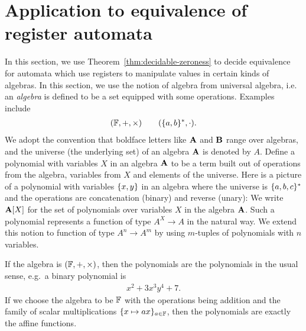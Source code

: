 \section{Application to equivalence of register automata}
\label{sec:applications-of-zeroness}
In this section, we  use Theorem~\ref{thm:decidable-zeroness} to decide equivalence for automata which use registers to manipulate values in certain kinds of algebras. In this section, we use the notion of algebra from universal algebra, 
i.e.~ an \emph{algebra} is defined to  be a set equipped with some operations. Examples include
\begin{align*}
  (\mathbb F, + , \times) \qquad (\{a,b\}^*, \cdot).
\end{align*}
We adopt the convention that boldface letters like $\mathbf A$ and $\mathbf B$ range over algebras, and the universe (the underlying set) of an algebra $\mathbf A$ is denoted by $A$.
Define a  polynomial with variables $X$  in an algebra $\mathbf A$ to be a term built out of operations from the algebra, variables from $X$  and elements of the universe. Here is a picture of a polynomial with variables $\{x,y\}$ in an algebra where the universe is $\{a,b,c\}^*$ and the operations are concatenation (binary) and reverse (unary):
We write $\mathbf A[X]$ for the set of polynomials over variables $X$ in the algebra $\mathbf A$. Such a polynomial represents a function of type $A^X \to A$ in the natural way. We extend this notion to function of type $A^n \to A^m$ by using $m$-tuples of polynomials with $n$ variables.

\begin{example}
	If the algebra is $(\mathbb F, + ,\times)$, then the polynomials are the polynomials in the usual sense, e.g.~a binary polynomial is
	\begin{align*}
x^2 + 3x^3 y^4  + 7.
\end{align*}
If we choose the algebra to be $\mathbb F$ with the operations being addition and the family of scalar multiplications $\{x \mapsto ax\}_{a \in \mathbb F}$, then the polynomials are exactly the affine functions.
\end{example}

